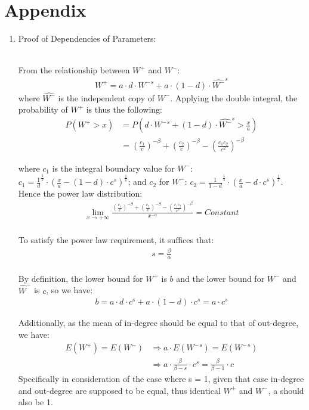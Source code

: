 \documentclass{article}
\begin{document}
\section{Appendix}
\begin{enumerate}
\item  \hypertarget{pf_of_dependency}{Proof of Dependencies of Parameters:} \\
From the relationship between $W^{+}$ and $W^{-}$: 
  \begin{align*}
 W^{+} = a \cdot d \cdot{W^{-}}^{s} + a \cdot (1-d) \cdot {\hat{W^{-}}} ^{s} 
 \end{align*}
 where $\hat{W^{-}}$ is the independent copy of $W^{-}$. Applying the double integral, the probability of $W^{+}$ is thus the following:
  \begin{align*}
 P( W^{+} > x ) & = P( d \cdot{W^{-}}^{s} + (1 - d) \cdot {\hat{W^{-}}} ^{s} > \frac{x}{a} ) \\
          & =  {(\frac{c_{1}}{c})}^{-\beta} +  {(\frac{c_{2}}{c})}^{-\beta} -  {(\frac{ c_{1}c_{2}   }{ c^{2} })}^{-\beta}
 \end{align*}
 
 where $c_{1}$ is the integral boundary value for $W^{-}$: $c_{1} = {\frac{1}{d}}^{\frac{1}{s}} \cdot {( \frac{x}{a} - (1-d) \cdot c^{s})}^{\frac{1}{s}}$; and $c_{2}$ for $\hat{W^{-}}$: 
 $c_{2} = {\frac{1}{1-d}}^{\frac{1}{s}} \cdot {( \frac{x}{a} - d \cdot c^{s})}^{\frac{1}{s}}$. Hence the power law distribution:
 \begin{align*}
\lim_{x \rightarrow +\infty } \frac{ {(\frac{c_{1}}{c})}^{-\beta} +  {(\frac{c_{2}}{c})}^{-\beta} -  {(\frac{ c_{1}c_{2}   }{ c^{2} })}^{-\beta}  }{x^{-\alpha}} = Constant
\end{align*}
 \quad\\

To satisfy the power law requirement, it suffices that:
  \begin{align*}
  s = \frac{\beta} {\alpha} 
 \end{align*}
 \quad\\
 By definition, the lower bound for $W^{+}$ is $b$ and the lower bound for $W^-$ and $\hat{W}^-$ is $c$, so we have:
   \begin{align*}
  b = a \cdot d \cdot c^{s} + a \cdot (1-d) \cdot c^{s} = a \cdot c^{s}
 \end{align*}
 
 Additionally, as the mean of in-degree should be equal to that of out-degree, we have: 
  \begin{align*}
  E(W^{+}) = E(W^{-})  & \Rightarrow    a \cdot E({W^{-}}^{s}) = E({W^{-}}^{s})  \\
 & \Rightarrow    a \cdot \frac{\beta}{\beta - s} \cdot c^{s} = \frac{\beta}{\beta-1} \cdot c  
 \end{align*}
 Specifically in consideration of the case where s = 1, given that case in-degree and out-degree are supposed to be equal, thus identical $W^{+}$ and $W^{-}$, a should also be 1.


\end{enumerate}
\end{document}

